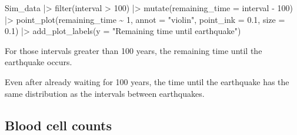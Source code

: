 \documentclass[
  letterpaper,
  DIV=11,
  numbers=noendperiod,
  oneside]{scrartcl}
\newenvironment{Shaded}{\begin{snugshade}}{\end{snugshade}}
\newcommand{\AttributeTok}[1]{\textcolor[rgb]{0.40,0.45,0.13}{#1}}
\newcommand{\DecValTok}[1]{\textcolor[rgb]{0.68,0.00,0.00}{#1}}
\newcommand{\FloatTok}[1]{\textcolor[rgb]{0.68,0.00,0.00}{#1}}
\newcommand{\FunctionTok}[1]{\textcolor[rgb]{0.28,0.35,0.67}{#1}}
\newcommand{\NormalTok}[1]{\textcolor[rgb]{0.00,0.23,0.31}{#1}}
\newcommand{\SpecialCharTok}[1]{\textcolor[rgb]{0.37,0.37,0.37}{#1}}
\newcommand{\StringTok}[1]{\textcolor[rgb]{0.13,0.47,0.30}{#1}}
\begin{document}
\begin{Shaded}
\begin{Highlighting}[]
\NormalTok{Sim\_data }\SpecialCharTok{|\textgreater{}} \FunctionTok{filter}\NormalTok{(interval }\SpecialCharTok{\textgreater{}} \DecValTok{100}\NormalTok{) }\SpecialCharTok{|\textgreater{}}
  \FunctionTok{mutate}\NormalTok{(}\AttributeTok{remaining\_time =}\NormalTok{ interval }\SpecialCharTok{{-}} \DecValTok{100}\NormalTok{) }\SpecialCharTok{|\textgreater{}}
  \FunctionTok{point\_plot}\NormalTok{(remaining\_time }\SpecialCharTok{\textasciitilde{}} \DecValTok{1}\NormalTok{, }\AttributeTok{annot =} \StringTok{"violin"}\NormalTok{,}
             \AttributeTok{point\_ink =} \FloatTok{0.1}\NormalTok{, }\AttributeTok{size =} \FloatTok{0.1}\NormalTok{) }\SpecialCharTok{|\textgreater{}}
  \FunctionTok{add\_plot\_labels}\NormalTok{(}\AttributeTok{y =} \StringTok{"Remaining time until earthquake"}\NormalTok{) }
\end{Highlighting}
\end{Shaded}

\begin{marginfigure}


\caption{\label{fig-remaining-time}For those intervals greater than 100
years, the remaining time until the earthquake occurs.}

\end{marginfigure}%

Even after already waiting for 100 years, the time until the earthquake
has the same distribution as the intervals between earthquakes.

\subsection{Blood cell counts}\label{blood-cell-counts}
\end{document}
